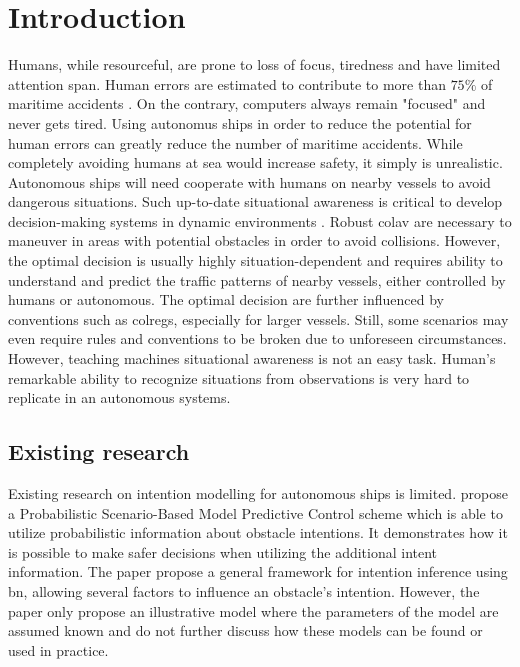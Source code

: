 \chapter{Introduction}

Humans, while resourceful, are prone to loss of focus, tiredness and have limited attention span. Human errors are estimated to contribute to more than $75\%$ of maritime accidents \cite{Tengesdal2020RiskbasedAM}. On the contrary, computers always remain "focused" and never gets tired. Using autonomus ships in order to reduce the potential for human errors can greatly reduce the number of maritime accidents.
While completely avoiding humans at sea would increase safety, it simply is unrealistic. Autonomous ships will need cooperate with humans on nearby vessels to avoid dangerous situations. Such up-to-date situational awareness is critical to develop decision-making systems in dynamic environments \cite{endsley}. Robust \acrfull{colav} are necessary to  maneuver in areas with potential obstacles in order to avoid collisions. However, the optimal decision is usually highly situation-dependent and requires ability to understand and predict the traffic patterns of nearby vessels, either controlled by humans or autonomous. The optimal decision are further influenced by conventions such as \Gls{colregs}, especially for larger vessels. Still, some scenarios may even require rules and conventions to be broken due to unforeseen circumstances.
However, teaching machines situational awareness is not an easy task. Human's remarkable ability to recognize situations from observations is very hard to replicate in an autonomous systems.

\section{Existing research}
 Existing research on intention modelling for autonomous ships is limited. \cite{Tengesdal2020RiskbasedAM} propose a Probabilistic Scenario-Based Model Predictive Control scheme which is able to utilize probabilistic information about obstacle intentions. It demonstrates how it is possible to make safer decisions when utilizing the additional intent information. The paper propose a general framework for intention inference using \acrfull{bn}, allowing several factors to influence an obstacle's intention. However, the paper only propose an illustrative model where the parameters of the model are assumed known and do not further discuss how these models can be found or used in practice.  

